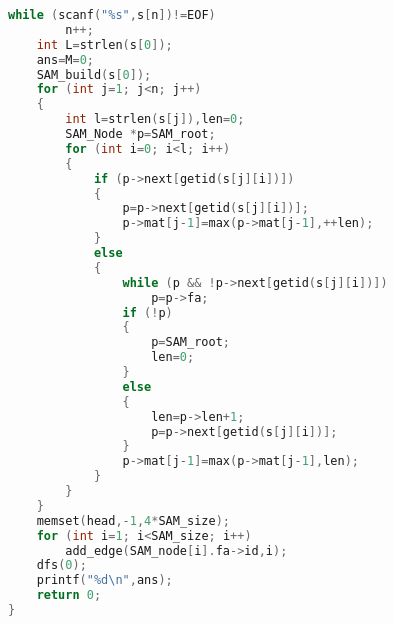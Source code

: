 \begin{lstlisting}[language=c++]
    while (scanf("%s",s[n])!=EOF)
        n++;
    int L=strlen(s[0]);
    ans=M=0;
    SAM_build(s[0]);
    for (int j=1; j<n; j++)
    {
        int l=strlen(s[j]),len=0;
        SAM_Node *p=SAM_root;
        for (int i=0; i<l; i++)
        {
            if (p->next[getid(s[j][i])])
            {
                p=p->next[getid(s[j][i])];
                p->mat[j-1]=max(p->mat[j-1],++len);
            }
            else
            {
                while (p && !p->next[getid(s[j][i])])
                    p=p->fa;
                if (!p)
                {
                    p=SAM_root;
                    len=0;
                }
                else
                {
                    len=p->len+1;
                    p=p->next[getid(s[j][i])];
                }
                p->mat[j-1]=max(p->mat[j-1],len);
            }
        }
    }
    memset(head,-1,4*SAM_size);
    for (int i=1; i<SAM_size; i++)
        add_edge(SAM_node[i].fa->id,i);
    dfs(0);
    printf("%d\n",ans);
    return 0;
}
    \end{lstlisting}
    
